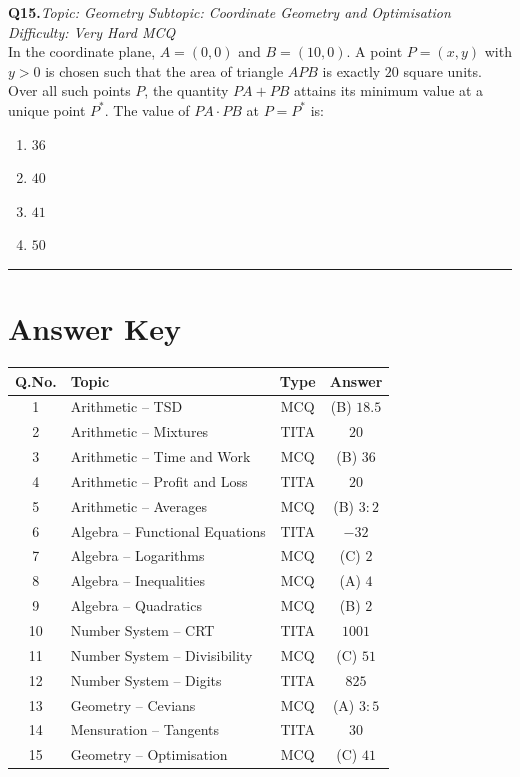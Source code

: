\documentclass[11pt,a4paper]{article}
\newcommand{\qhead}[4]{%
  \vspace{0.7em}\noindent\textbf{Q#1.}\hfill\textit{Topic: #2 \textbar{} Subtopic: #3 \textbar{} Difficulty: #4}\\[-0.2em]
}
\begin{document}
\qhead{15}{Geometry}{Coordinate Geometry and Optimisation}{Very Hard \textbar{} MCQ}
In the coordinate plane, $A=(0,0)$ and $B=(10,0)$. A point $P=(x,y)$ with $y>0$ is chosen such that the area of triangle $APB$ is exactly $20$ square units. Over all such points $P$, the quantity $PA+PB$ attains its minimum value at a unique point $P^{*}$. The value of $PA\cdot PB$ at $P=P^{*}$ is:
\begin{enumerate}[label=(\Alph*),leftmargin=*]
  \item $36$
  \item $40$
  \item $41$
  \item $50$
\end{enumerate}

\vspace{0.6em}\hrule\vspace{0.6em}

\section*{Answer Key}

\begin{center}
\renewcommand{\arraystretch}{1.25}
\begin{tabular}{|c|l|c|c|}
\hline
\textbf{Q.No.} & \textbf{Topic} & \textbf{Type} & \textbf{Answer} \\
\hline
1  & Arithmetic -- TSD                     & MCQ  & (B) $18.5$ \\
2  & Arithmetic -- Mixtures                & TITA & $20$ \\
3  & Arithmetic -- Time and Work           & MCQ  & (B) $36$ \\
4  & Arithmetic -- Profit and Loss         & TITA & $20$ \\
5  & Arithmetic -- Averages                & MCQ  & (B) $3:2$ \\
6  & Algebra -- Functional Equations       & TITA & $-32$ \\
7  & Algebra -- Logarithms                 & MCQ  & (C) $2$ \\
8  & Algebra -- Inequalities               & MCQ  & (A) $4$ \\
9  & Algebra -- Quadratics                 & MCQ  & (B) $2$ \\
10 & Number System -- CRT                  & TITA & $1001$ \\
11 & Number System -- Divisibility         & MCQ  & (C) $51$ \\
12 & Number System -- Digits               & TITA & $825$ \\
13 & Geometry -- Cevians                   & MCQ  & (A) $3:5$ \\
14 & Mensuration -- Tangents               & TITA & $30$ \\
15 & Geometry -- Optimisation              & MCQ  & (C) $41$ \\
\hline
\end{tabular}
\end{center}
\end{document}
